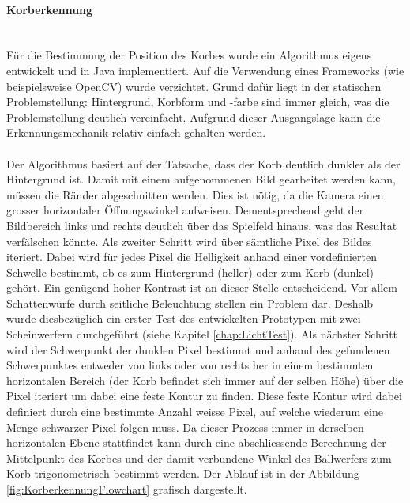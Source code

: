 	\paragraph{Korberkennung}$~~$\vspace{2mm}\\
		Für die Bestimmung der Position des Korbes wurde ein Algorithmus 
		eigens entwickelt und in Java implementiert. Auf die Verwendung eines 
		Frameworks (wie beispielsweise OpenCV) wurde verzichtet. Grund dafür 
		liegt in der statischen Problemstellung: Hintergrund, Korbform und -farbe 
		sind immer gleich, was die Problemstellung deutlich vereinfacht. Aufgrund 
		dieser Ausgangslage kann die Erkennungsmechanik relativ einfach gehalten 
		werden. \\
		\\
		Der Algorithmus 
		basiert auf der Tatsache, dass der Korb deutlich dunkler als der 
		Hintergrund ist. Damit mit einem aufgenommenen Bild gearbeitet werden kann, 
		müssen die Ränder abgeschnitten werden. Dies ist nötig, da die Kamera einen 
		grosser horizontaler Öffnungswinkel aufweisen. Dementsprechend geht der 
		Bildbereich links und rechts deutlich über das Spielfeld 
		hinaus, was das Resultat verfälschen könnte. Als zweiter Schritt wird 
		über sämtliche Pixel des Bildes iteriert. Dabei wird für jedes Pixel die 
		Helligkeit anhand einer vordefinierten Schwelle bestimmt, ob es zum 
		Hintergrund (heller) oder zum Korb (dunkel) gehört. Ein genügend hoher 
		Kontrast ist an dieser Stelle entscheidend. Vor allem Schattenwürfe durch 
		seitliche Beleuchtung stellen ein Problem dar. Deshalb wurde diesbezüglich 
		ein erster Test des entwickelten Prototypen mit zwei Scheinwerfern 
		durchgeführt (siehe Kapitel \ref{chap:LichtTest}). Als nächster Schritt 
		wird der Schwerpunkt der dunklen Pixel bestimmt und anhand des gefundenen 
		Schwerpunktes entweder von links oder von rechts her in einem bestimmten 
		horizontalen Bereich (der Korb befindet sich immer auf der selben Höhe)
		über die Pixel iteriert um dabei eine feste Kontur zu finden. Diese feste 
		Kontur wird dabei definiert durch eine bestimmte Anzahl weisse Pixel, auf 
		welche wiederum eine Menge schwarzer Pixel folgen muss. Da dieser Prozess 
		immer in derselben horizontalen Ebene stattfindet kann durch eine 
		abschliessende Berechnung der Mittelpunkt des Korbes und der damit 
		verbundene Winkel des Ballwerfers zum Korb trigonometrisch bestimmt werden.
		Der Ablauf ist in der Abbildung \ref{fig:KorberkennungFlowchart} grafisch 
		dargestellt.
